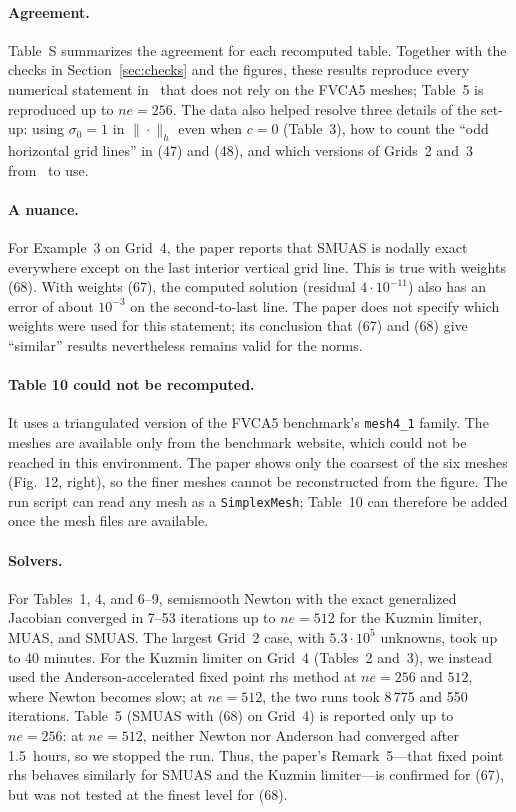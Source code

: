 \documentclass[11pt]{article}
\begin{document}
\paragraph{Agreement.} Table~S summarizes the agreement for each recomputed table. Together with the checks in
Section~\ref{sec:checks} and the figures, these results reproduce every numerical statement in~\cite{Kn23} that does
not rely on the FVCA5 meshes; Table~5 is reproduced up to $ne=256$. The data also helped resolve three details of
the set-up: using $\sigma_0=1$ in $\|\cdot\|_h$ even when $c=0$ (Table~3), how to count the ``odd horizontal grid
lines'' in (47) and (48), and which versions of Grids~2 and~3 from~\cite{BJK16} to use.

\paragraph{A nuance.} For Example~3 on Grid~4, the paper reports that SMUAS is nodally exact everywhere except on
the last interior vertical grid line. This is true with weights (68). With weights (67), the computed solution
(residual $4\cdot10^{-11}$) also has an error of about $10^{-3}$ on the second-to-last line. The paper does not
specify which weights were used for this statement; its conclusion that (67) and (68) give ``similar'' results
nevertheless remains valid for the norms.

\paragraph{Table 10 could not be recomputed.} It uses a triangulated version of the FVCA5 benchmark's
\texttt{mesh4\_1} family. The meshes are available only from the benchmark website, which could not be reached in
this environment. The paper shows only the coarsest of the six meshes (Fig.~12, right), so the finer meshes cannot
be reconstructed from the figure. The run script can read any mesh as a \texttt{SimplexMesh}; Table~10 can therefore
be added once the mesh files are available.

\paragraph{Solvers.} For Tables~1, 4, and 6--9, semismooth Newton with the exact generalized Jacobian converged in
7--53 iterations up to $ne=512$ for the Kuzmin limiter, MUAS, and SMUAS. The largest Grid~2 case, with
$5.3\cdot10^5$ unknowns, took up to 40 minutes. For the Kuzmin limiter on Grid~4 (Tables~2 and~3), we instead used
the Anderson-accelerated fixed point rhs method at $ne=256$ and $512$, where Newton becomes slow; at $ne=512$, the
two runs took 8\,775 and 550 iterations. Table~5 (SMUAS with (68) on Grid~4) is reported only up to $ne=256$:
at $ne=512$, neither Newton nor Anderson had converged after 1.5~hours, so we stopped the run. Thus, the paper's
Remark~5—that fixed point rhs behaves similarly for SMUAS and the Kuzmin limiter—is confirmed for (67), but was
not tested at the finest level for (68).
\end{document}
